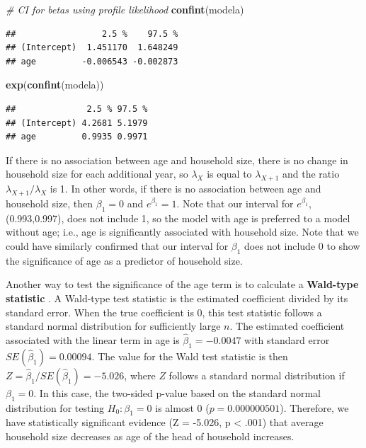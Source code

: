 \documentclass[
]{krantz}
\newenvironment{Shaded}{\begin{snugshade}}{\end{snugshade}}
\newcommand{\CommentTok}[1]{\textcolor[rgb]{0.37,0.37,0.37}{\textit{#1}}}
\newcommand{\KeywordTok}[1]{\textcolor[rgb]{0.27,0.27,0.27}{\textbf{#1}}}
\newcommand{\NormalTok}[1]{#1}
\begin{document}
\begin{Shaded}
\begin{Highlighting}[]
\CommentTok{# CI for betas using profile likelihood}
\KeywordTok{confint}\NormalTok{(modela)}
\end{Highlighting}
\end{Shaded}

\begin{verbatim}
##                 2.5 %    97.5 %
## (Intercept)  1.451170  1.648249
## age         -0.006543 -0.002873
\end{verbatim}

\begin{Shaded}
\begin{Highlighting}[]
\KeywordTok{exp}\NormalTok{(}\KeywordTok{confint}\NormalTok{(modela))}
\end{Highlighting}
\end{Shaded}

\begin{verbatim}
##              2.5 % 97.5 %
## (Intercept) 4.2681 5.1979
## age         0.9935 0.9971
\end{verbatim}

If there is no association between age and household size, there is no change in household size for each additional year, so \(\lambda_X\) is equal to \(\lambda_{X+1}\) and the ratio \(\lambda_{X+1}/\lambda_X\) is 1. In other words, if there is no association between age and household size, then \(\beta_1=0\) and \(e^{\beta_1}=1\). Note that our interval for \(e^{\beta_1}\), (0.993,0.997), does not include 1, so the model with age is preferred to a model without age; i.e., age is significantly associated with household size. Note that we could have similarly confirmed that our interval for \(\beta_1\) does not include 0 to show the significance of age as a predictor of household size.

Another way to test the significance of the age term is to calculate a \textbf{Wald-type statistic} . A Wald-type test statistic is the estimated coefficient divided by its standard error. When the true coefficient is 0, this test statistic follows a standard normal distribution for sufficiently large \(n\). The estimated coefficient associated with the linear term in age is \({\hat{\beta}_1}=-0.0047\) with standard error \(SE(\hat{\beta}_1)=0.00094\). The value for the Wald test statistic is then \(Z=\hat{\beta}_1/SE(\hat{\beta}_1)=-5.026\), where \(Z\) follows a standard normal distribution if \(\beta_1=0\). In this case, the two-sided p-value based on the standard normal distribution for testing \(H_0:\beta_1=0\) is almost 0 (\(p=0.000000501\)). Therefore, we have statistically significant evidence (Z = -5.026, p \textless{} .001) that average household size decreases as age of the head of household increases.
\end{document}
